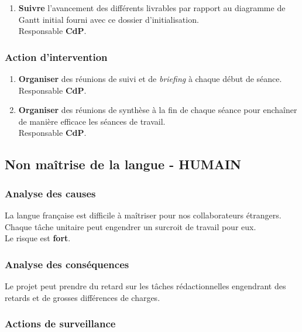 \documentclass[twoside]{article}
\begin{document}
\begin{enumerate}
\item {\bf Suivre} l'avancement des différents livrables par rapport au diagramme
de Gantt initial fourni avec ce dossier d'initialisation. \\
Responsable {\bf CdP}.
\end{enumerate}

\subsubsection{Action d'intervention}

\begin{enumerate}
\item {\bf Organiser} des réunions de suivi et de \textsl{briefing} à chaque
début de séance. \\
Responsable {\bf CdP}.
\item {\bf Organiser} des réunions de synthèse à la fin de chaque séance pour
enchaîner de manière efficace les séances de travail. \\
Responsable {\bf CdP}.
\end{enumerate}

\subsection{Non maîtrise de la langue - HUMAIN}
\subsubsection{Analyse des causes}

La langue française est difficile à maîtriser pour nos collaborateurs étrangers.
Chaque tâche unitaire peut engendrer un surcroit de travail pour eux. \\
Le risque est {\bf fort}.

\subsubsection{Analyse des conséquences}

Le projet peut prendre du retard sur les tâches rédactionnelles engendrant des
retards et de grosses différences de charges.

\subsubsection{Actions de surveillance}
\end{document}
